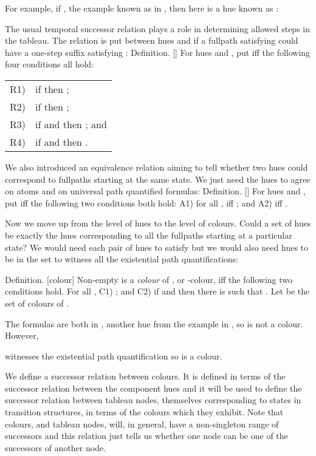 \documentclass[submission,copyright,creativecommons]{eptcs}
\newenvironment{definition}{Definition. }{}
\begin{document}
For example, if ,
the example known as  in \cite{Rey:startab},
then here is a hue known as :


The usual temporal successor relation
plays a role in determining allowed steps in the tableau.
The relation  is put between hues  and 
if a fullpath  satisfying 
could have a one-step suffix 
satisfying :
\begin{definition}[]
For hues  and ,
put  iff
the following four conditions all hold:\\
\begin{tabular}{ll}
R1) &
if
 then ;\\
R2) &
if 
 then ;\\
R3) &
if
 and  then
; and\\
R4) &
if
 and  then
.\\
\end{tabular}
\end{definition}

We also introduced an
equivalence relation aiming
to tell whether two
hues could correspond to
fullpaths
starting at the same state.
We just need the hues to agree
on atoms and on
universal path quantified formulas:
\begin{definition}[]
For hues  and ,
put  iff
the following two conditions both hold:
A1)  for all ,  iff ; and
A2)  iff .
\end{definition}

Now we move up from the level of hues
to the level of colours.
Could a set of hues be exactly
the hues corresponding to
all the fullpaths
starting at a particular state?
We would need each pair of hues to 
satisfy  but we would also
need hues to be in the set 
to witness all the 
existential path quantifications:

\begin{definition}[colour]
Non-empty  is a {\em colour}
of ,
or -colour, iff the following
two conditions hold.
For all ,
C1)  ; and
C2)
if  and 
then
 there is  such that .
Let  be the set of colours of .
\end{definition}

The formulas  are both in ,
another hue from the example in \cite{Rey:startab},
so 
is not a colour.
However,

witnesses the existential
path quantification
so  is a colour.



We define a successor relation
 between colours.
It is defined in terms of 
the successor relation
 between
the component hues
and it will be used to define
the successor relation between
tableau nodes,
themselves
corresponding to
states in transition structures,
in terms of the colours which they exhibit.
Note that colours,
and tableau nodes, will,
in general, have a non-singleton range
of successors
and this relation 
just tells us whether one node
can be one of the
successors of another node.
\end{document}
